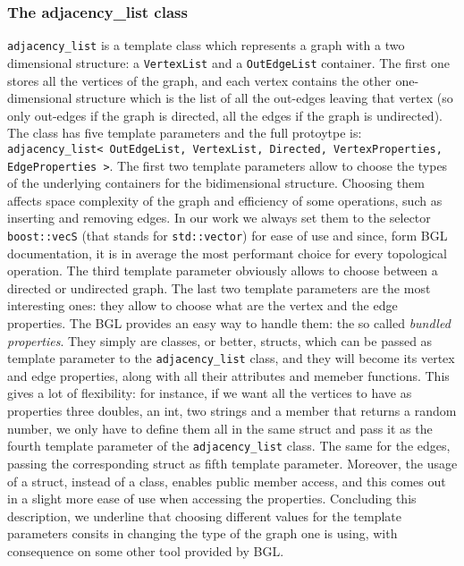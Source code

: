 \documentclass[11pt]{article} %
\newcommand{\classname}[1]{\texttt{#1}}
\begin{document}
		\subsubsection{The adjacency\_list class}
		\classname{adjacency\_list} is a template class which represents a graph with a two dimensional structure: 
		a \texttt{VertexList} and a \texttt{OutEdgeList} container. The first one stores all the vertices of the graph, and each vertex contains the other one-dimensional structure which is the list of all the out-edges leaving that vertex (so only out-edges if the graph is directed, all the edges if the graph is undirected). \newline
		The class has five template parameters and the full protoytpe is: \classname{adjacency\_list< OutEdgeList, VertexList, Directed, VertexProperties, EdgeProperties >}. \newline
		The first two template parameters allow to choose the types of the underlying containers for the bidimensional structure. Choosing them affects space complexity of the graph and efficiency of some operations, such as inserting and removing edges. In our work we always set them to the selector \classname{boost::vecS} (that stands for \texttt{std::vector}) for ease of use and since, form BGL documentation, it is in average the most performant choice for every topological operation. \newline
		The third template parameter obviously allows to choose between a directed or undirected graph.\newline
		The last two template parameters are the most interesting ones: they allow to choose what are the vertex and the edge properties. The BGL provides an easy way to handle them: the so called \textit{bundled properties}. They simply are classes, or better, structs, which can be passed as template parameter to the \classname{adjacency\_list} class, and they will become its vertex and edge properties, along with all their attributes and memeber functions. This gives a lot of flexibility: for instance, if we want all the vertices to have as properties three doubles, an int, two strings and a member that returns a random number, we only have to define them all in the same struct and pass it as the fourth template parameter of the \classname{adjacency\_list} class. The same for the edges, passing the corresponding struct as fifth template parameter. Moreover, the usage of a struct, instead of a class, enables public member access, and this comes out in a slight more ease of use when accessing the properties. \newline
		Concluding this description, we underline that choosing different values for the template parameters consits in changing the type of the graph one is using, with consequence on some other tool provided by BGL.
		
\end{document}

